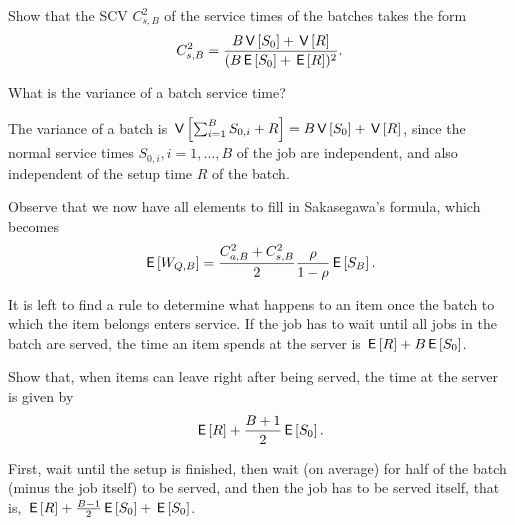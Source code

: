 \begin{exercise}
Show that the SCV $C_{s,B}^2$ of the service times of the batches takes the form
\begin{equation}\label{eq:84}
C_{s, B}^2 = \frac{B \,\mathsf{V}\left[S_0\right] + \,\mathsf{V}\left[R\right]}{(B \,\mathsf{E}\left[S_0\right] + \,\mathsf{E}\left[R\right])^2}.
\end{equation}
\begin{hint}
 What is the variance of a batch service time?
\end{hint}
\begin{solution}
 The variance of a batch is $\,\mathsf{V}\left[\sum_{i=1}^B S_{0,i} + R\right] = B\,\mathsf{V}\left[S_0\right] + \,\mathsf{V}\left[R\right]$, since the normal service times $S_{0,i}, i=1,\ldots, B$ of the job are independent, and also independent of the setup time $R$ of the batch.
\end{solution}
\end{exercise}

Observe that we now have all elements to fill in Sakasegawa's formula, which becomes
\begin{equation*}
  \,\mathsf{E}\left[W_{Q,B}\right] = \frac{C_{a,B}^2 + C_{s,B}^2}2 \frac \rho{1-\rho} \,\mathsf{E}\left[S_B\right].
\end{equation*}

It is left to find a rule to determine what happens to an item once the batch to which the item belongs enters service.
If the job has to wait until all jobs in the batch are served, the time an item spends at the server is $\,\mathsf{E}\left[R\right] + B \,\mathsf{E}\left[S_0\right]$.


\begin{exercise}
Show that, when items can leave right after being served, the time at the server is given by
\begin{equation}\label{eq:85}
\,\mathsf{E}\left[R\right] + \frac{B+1}{2}\,\mathsf{E}\left[S_0\right].
\end{equation}
\begin{solution}
 First, wait until the setup is finished, then wait (on average) for half of the batch (minus the job itself) to be served, and then the job has to be served itself, that is,
$\,\mathsf{E}\left[R\right] + \frac{B-1}{2}\,\mathsf{E}\left[S_0\right] +\,\mathsf{E}\left[S_0\right]$.
\end{solution}
\end{exercise}


